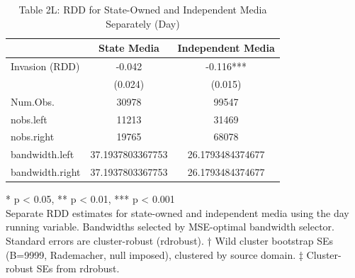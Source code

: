 \begin{table}[t]
\caption{\label{tab:table2l}Table 2L: RDD for State-Owned and Independent Media Separately (Day)} 
\fontsize{12.0pt}{14.0pt}\selectfont
\begin{tabular*}{\linewidth}{@{\extracolsep{\fill}}lcc}
\toprule
  & State Media & Independent Media \\ 
\midrule\addlinespace[2.5pt]
Invasion (RDD) & -0.042 & -0.116*** \\ 
{} & {(0.024)} & {(0.015)} \\ 
Num.Obs. & 30978 & 99547 \\ 
nobs.left & 11213 & 31469 \\ 
nobs.right & 19765 & 68078 \\ 
bandwidth.left & 37.1937803367753 & 26.1793484374677 \\ 
bandwidth.right & 37.1937803367753 & 26.1793484374677 \\ 
\bottomrule
\end{tabular*}
\begin{minipage}{\linewidth}
\vspace{.05em}
* p < 0.05, ** p < 0.01, *** p < 0.001\\
Separate RDD estimates for state-owned and independent media using the day
running variable. Bandwidths selected by MSE-optimal bandwidth selector.
Standard errors are cluster-robust (rdrobust). † Wild cluster bootstrap SEs
(B=9999, Rademacher, null imposed), clustered by source domain. ‡ Cluster-robust
SEs from rdrobust.\\
\end{minipage}
\end{table}

